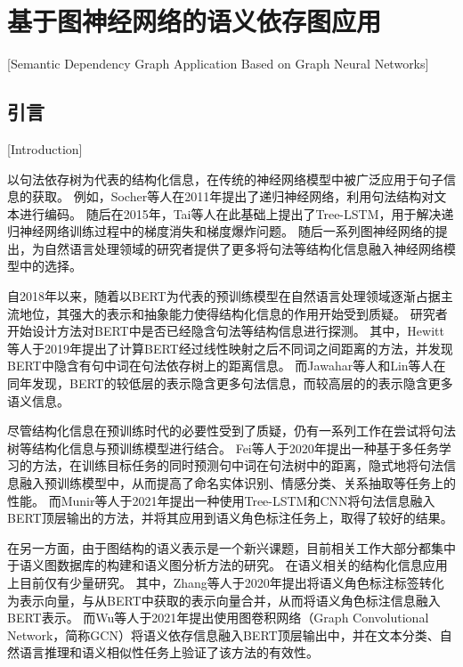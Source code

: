 
\chapter[基于图神经网络的语义依存图应用]{基于图神经网络的语义依存图应用}[Semantic Dependency Graph Application Based on Graph Neural Networks]

\section{引言}[Introduction]
\label{sec:chapter5-intro}

以句法依存树为代表的结构化信息，在传统的神经网络模型中被广泛应用于句子信息的获取。
例如，Socher等人\cite{socher-etal-2011-parsing}在2011年提出了递归神经网络，利用句法结构对文本进行编码。
随后在2015年，Tai等人在此基础上提出了Tree-LSTM，用于解决递归神经网络训练过程中的梯度消失和梯度爆炸问题。
随后一系列图神经网络\cite{kipf-welling-2017-semi, velickovic-etal-2018-gat}的提出，为自然语言处理领域的研究者提供了更多将句法等结构化信息融入神经网络模型中的选择。


自2018年以来，随着以BERT为代表的预训练模型在自然语言处理领域逐渐占据主流地位，其强大的表示和抽象能力使得结构化信息的作用开始受到质疑。
研究者开始设计方法对BERT中是否已经隐含句法等结构信息进行探测。
其中，Hewitt等人\cite{hewitt-manning-2019-structural}于2019年提出了计算BERT经过线性映射之后不同词之间距离的方法，并发现BERT中隐含有句中词在句法依存树上的距离信息。
而Jawahar等人\cite{jawahar-etal-2019-bert}和Lin等人\cite{lin-etal-2019-open}在同年发现，BERT的较低层的表示隐含更多句法信息，而较高层的的表示隐含更多语义信息。

尽管结构化信息在预训练时代的必要性受到了质疑，仍有一系列工作在尝试将句法树等结构化信息与预训练模型进行结合。
Fei等人\cite{fei-etal-2020-retrofitting}于2020年提出一种基于多任务学习的方法，在训练目标任务的同时预测句中词在句法树中的距离，隐式地将句法信息融入预训练模型中，从而提高了命名实体识别、情感分类、关系抽取等任务上的性能。
而Munir等人\cite{munir-etal-2021-adaptive}于2021年提出一种使用Tree-LSTM和CNN将句法信息融入BERT顶层输出的方法，并将其应用到语义角色标注任务上，取得了较好的结果。

在另一方面，由于图结构的语义表示是一个新兴课题，目前相关工作大部分都集中于语义图数据库的构建\cite{banarescu-etal-2013-abstract,abend-rappoport-2013-universal,oepen-etal-2015-semeval,che-etal-2016-semeval}和语义图分析方法的研究\cite{hershcovich-etal-2017-transition,dozat-manning-2018-simpler,cai-lam-2020-amr}。
在语义相关的结构化信息应用上目前仅有少量研究。
其中，Zhang等人\cite{zhang-etal-2020-semantics}于2020年提出将语义角色标注标签转化为表示向量，与从BERT中获取的表示向量合并，从而将语义角色标注信息融入BERT表示。
而Wu等人\cite{wu-etal-2021-infusing}于2021年提出使用图卷积网络\cite{kipf-welling-2017-semi}（Graph Convolutional Network，简称GCN）将语义依存信息融入BERT顶层输出中，并在文本分类、自然语言推理和语义相似性任务上验证了该方法的有效性。


